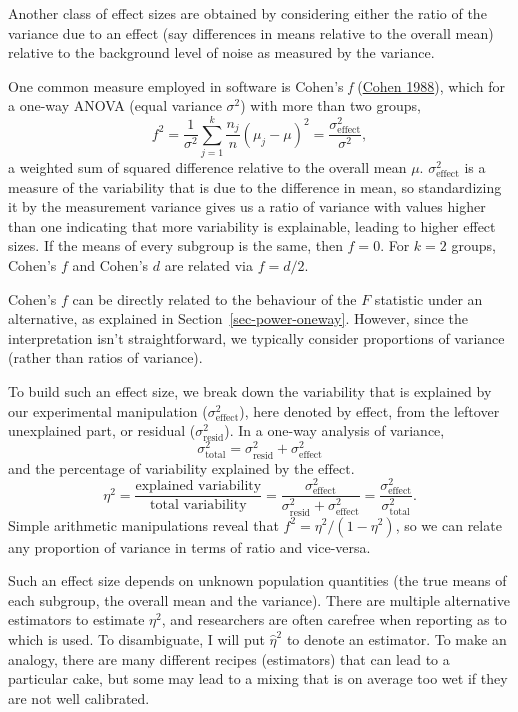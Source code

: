 \documentclass[
  11pt,
  letterpaper,
]{scrbook}
\theoremstyle{definition}
\theoremstyle{remark}
\begin{document}
Another class of effect sizes are obtained by considering either the
ratio of the variance due to an effect (say differences in means
relative to the overall mean) relative to the background level of noise
as measured by the variance.

One common measure employed in software is Cohen's \emph{f}
(\protect\hyperlink{ref-Cohen:1988}{Cohen 1988}), which for a one-way
ANOVA (equal variance \(\sigma^2\)) with more than two groups, \[
f^2 = \frac{1}{\sigma^2} \sum_{j=1}^k \frac{n_j}{n}(\mu_j - \mu)^2 = \frac{\sigma^2_{\text{effect}}}{\sigma^2},
\] a weighted sum of squared difference relative to the overall mean
\(\mu\). \(\sigma^2_{\text{effect}}\) is a measure of the variability
that is due to the difference in mean, so standardizing it by the
measurement variance gives us a ratio of variance with values higher
than one indicating that more variability is explainable, leading to
higher effect sizes. If the means of every subgroup is the same, then
\(f=0\). For \(k=2\) groups, Cohen's \(f\) and Cohen's \(d\) are related
via \(f=d/2\).

Cohen's \(f\) can be directly related to the behaviour of the \(F\)
statistic under an alternative, as explained in
Section~\ref{sec-power-oneway}. However, since the interpretation isn't
straightforward, we typically consider proportions of variance (rather
than ratios of variance).

To build such an effect size, we break down the variability that is
explained by our experimental manipulation (\(\sigma^2_\text{effect}\)),
here denoted by effect, from the leftover unexplained part, or residual
(\(\sigma^2_\text{resid}\)). In a one-way analysis of variance,
\[\sigma^2_{\text{total}} = \sigma^2_{\text{resid}} + \sigma^2_{\text{effect}}\]
and the percentage of variability explained by the \(\text{effect}\).
\[\eta^2 = \frac{\text{explained variability}}{\text{total variability}}= \frac{\sigma^2_{\text{effect}}}{\sigma^2_{\text{resid}} + \sigma^2_{\text{effect}}} = \frac{\sigma^2_{\text{effect}}}{\sigma^2_{\text{total}}}.\]
Simple arithmetic manipulations reveal that \(f^2 = \eta^2/(1-\eta^2)\),
so we can relate any proportion of variance in terms of ratio and
vice-versa.

Such an effect size depends on unknown population quantities (the true
means of each subgroup, the overall mean and the variance). There are
multiple alternative estimators to estimate \(\eta^2\), and researchers
are often carefree when reporting as to which is used. To disambiguate,
I will put \(\hat{\eta}^2\) to denote an estimator. To make an analogy,
there are many different recipes (estimators) that can lead to a
particular cake, but some may lead to a mixing that is on average too
wet if they are not well calibrated.
\end{document}
